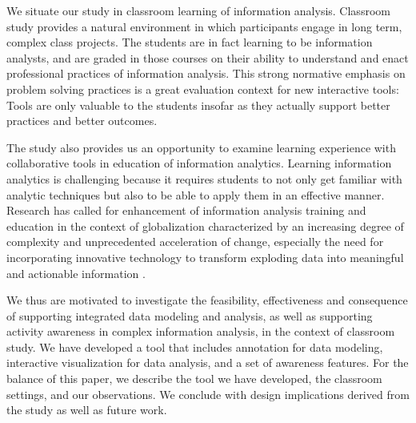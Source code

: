 \documentclass[]{article}
\begin{document}
We situate our study in classroom learning of information analysis.
Classroom study provides a natural environment in which participants
engage in long term, complex class projects. The students are in fact
learning to be information analysts, and are graded in those courses on
their ability to understand and enact professional practices of
information analysis. This strong normative emphasis on problem solving
practices is a great evaluation context for new interactive tools: Tools
are only valuable to the students insofar as they actually support
better practices and better outcomes.

The study also provides us an opportunity to examine learning experience
with collaborative tools in education of information analytics. Learning
information analytics is challenging because it requires students to not
only get familiar with analytic techniques but also to be able to apply
them in an effective manner. Research has called for enhancement of
information analysis training and education in the context of
globalization characterized by an increasing degree of complexity and
unprecedented acceleration of change, especially the need for
incorporating innovative technology to transform exploding data into
meaningful and actionable information \autocite{Martin2014}.

We thus are motivated to investigate the feasibility, effectiveness and
consequence of supporting integrated data modeling and analysis, as well
as supporting activity awareness in complex information analysis, in the
context of classroom study. We have developed a tool that includes
annotation for data modeling, interactive visualization for data
analysis, and a set of awareness features. For the balance of this
paper, we describe the tool we have developed, the classroom settings,
and our observations. We conclude with design implications derived from
the study as well as future work.

\printbibliography
\end{document}
